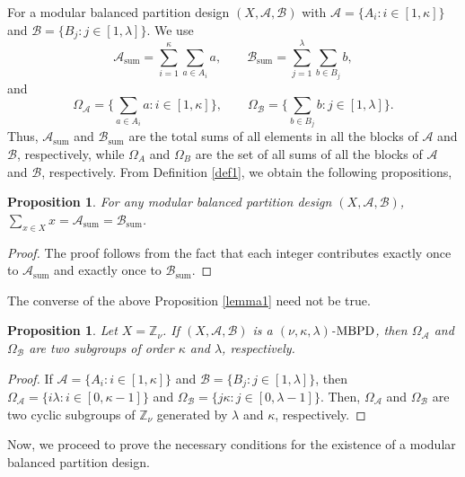 \documentclass[preprint,11pt]{elsarticle}
\newcommand{\MBPD}{\textnormal{MBPD}}
\newtheorem{proposition}[theorem]{Proposition}
\begin{document}
\noindent For a  modular balanced partition design $(X, \mathcal{A}, \mathcal{B})$ with \(\mathcal{A}=\{A_i: i \in [1,\kappa]\}\) and \(\mathcal{B}=\{B_j: j \in [1,\lambda]\}\). We use 
\[
\mathcal{A}_{\mathrm{sum}}
= \sum_{i=1}^{\kappa}\sum_{a\in A_i} a,
\qquad
\mathcal{B}_{\mathrm{sum}}
= \sum_{j=1}^{\lambda}\sum_{b\in B_j} b,
\]
and
\[
\Omega_{\mathcal{A}}
= \biggl\{\sum_{a\in A_i} a : i\in [1,\kappa]\biggr\},
\qquad
\Omega_{\mathcal{B}}
= \biggl\{\sum_{b\in B_j} b : j\in [1,\lambda]\biggr\}.
\]
Thus, \(\mathcal{A}_{\mathrm{sum}}\) and \(\mathcal{B}_{\mathrm{sum}}\) are the total sums of all elements in all the blocks of \(\mathcal{A}\) and \(\mathcal{B}\), respectively, while \(\Omega_{A}\) and \(\Omega_{B}\) are the set of all sums of all the blocks of $\mathcal{A}$ and $\mathcal{B}$, respectively.
From Definition \ref{def1}, we obtain the following propositions,
\begin{proposition}{\label{lemma1}}
For any modular balanced partition design $(X, \mathcal{A}, \mathcal{B})$,  
$\sum_{x\in X}x=\mathcal{A}_{\mathrm{sum}}=\mathcal{B}_{\mathrm{sum}}$.
\end{proposition}
\begin{proof}
   The proof follows from the fact that each integer contributes exactly once to \(\mathcal{A}_{\mathrm{sum}}\) and exactly once to \(\mathcal{B}_{\mathrm{sum}}\).
\end{proof} 
The converse of the above Proposition \ref{lemma1} need not be true. 
\begin{proposition}
\label{thmim} Let $X=\mathbb{Z}_\nu$. If $(X, \mathcal{A}, \mathcal{B})$ is a $(\nu,\kappa,\lambda)$-$\MBPD$, then $ \Omega_{\mathcal{A}}$ and $ \Omega_{\mathcal{B}}$ are two subgroups of order $\kappa$ and $\lambda$, respectively.
\end{proposition}
\begin{proof}
    If \(\mathcal{A}=\{A_i: i \in [1,\kappa]\}\) and \(\mathcal{B}=\{B_j: j \in [1,\lambda]\}\), then $\Omega_{\mathcal{A}}=\{i\lambda: i \in [0,\kappa-1]\}$ and $\Omega_{\mathcal{B}} =\{j\kappa: j \in [0,\lambda-1]\}$. Then, $\Omega_{\mathcal{A}}$ and $\Omega_{\mathcal{B}}$ are two cyclic subgroups of $\mathbb{Z}_{\nu}$ generated by $\lambda$ and $\kappa$, respectively.
\end{proof}
\noindent Now, we proceed to prove the necessary conditions for the existence of a modular balanced partition design. 
\end{document}
